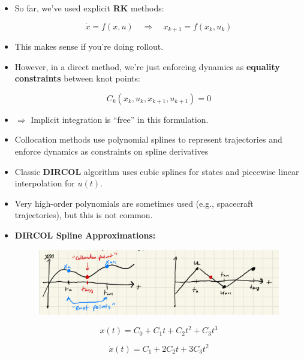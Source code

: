 \documentclass[11pt]{article}
\begin{document}
\begin{itemize}
    \item So far, we've used explicit \textbf{RK} methods:

    \begin{equation*}
        \dot{x} = f(x, u) \quad \Rightarrow \quad x_{k+1} = f(x_k, u_k)
    \end{equation*}

    \item This makes sense if you're doing rollout.
    \item However, in a direct method, we’re just enforcing dynamics as \textbf{equality constraints} between knot points:

    \begin{equation*}
        C_k(x_k, u_k, x_{k+1}, u_{k+1}) = 0
    \end{equation*}

    \item $\Rightarrow$ Implicit integration is ``free'' in this formulation.

    \item Collocation methods use polynomial splines to represent trajectories and enforce dynamics as constraints on spline derivatives
    \item Classic \textbf{DIRCOL} algorithm uses cubic splines for states and piecewise linear interpolation for $u(t)$.
    \item Very high-order polynomials are sometimes used (e.g., spacecraft trajectories), but this is not common.
    \item \textbf{DIRCOL Spline Approximations:}
\begin{figure}[H]
    \centering
    \includegraphics[width=0.95\linewidth]{lecture_13_1.png}
\end{figure}
    \begin{equation*}
    x(t) = C_0 + C_1 t + C_2 t^2 + C_3 t^3
\end{equation*}

\begin{equation*}
    \dot{x}(t) = C_1 + 2C_2 t + 3C_3 t^2
\end{equation*}


\end{itemize}
\end{document}
